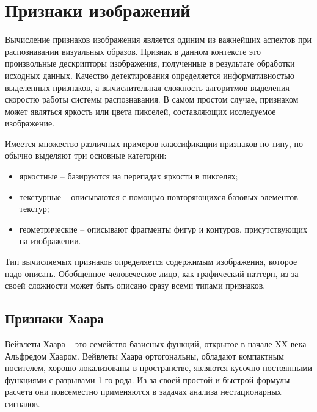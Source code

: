 \documentclass[a4paper, 14pt]{extarticle}	%
\begin{document}

\tableofcontents





\newpage
\section{Признаки изображений}

Вычисление признаков изображения является одиним из важнейших аспектов при распознавании визуальных образов. Признак в данном контексте это произвольные дескрипторы изображения, полученные в результате обработки исходных данных. Качество детектирования определяется информативностью выделенных признаков, а вычислительная сложность алгоритмов выделения -- скоростю работы системы распознавания. В самом простом случае, признаком может являться яркость или цвета пикселей, составляющих исследуемое изображение.

Имеется множество различных примеров классификации признаков по типу, но обычно выделяют три основные категории:
\begin{itemize}
\item яркостные -- базируются на перепадах яркости в пикселях;
\item текстурные -- описываются с помощью повторяющихся базовых элементов текстур;
\item геометрические -- описывают фрагменты фигур и контуров, присутствующих на изображении.
\end{itemize}

Тип вычисляемых признаков определяется содержимым изображения, которое надо описать. Обобщенное человеческое лицо, как графический паттерн, из-за своей сложности может быть описано сразу всеми типами признаков. 

\subsection{Признаки Хаара}

Вейвлеты Хаара -- это семейство базисных функций, открытое в начале XX века Альфредом Хааром. Вейвлеты Хаара ортогональны, обладают компактным носителем, хорошо локализованы в пространстве, являются кусочно-постоянными функциями с разрывами 1-го рода. Из-за своей простой и быстрой формулы расчета они повсеместно применяются в задачах анализа нестационарных сигналов.
\end{document}
